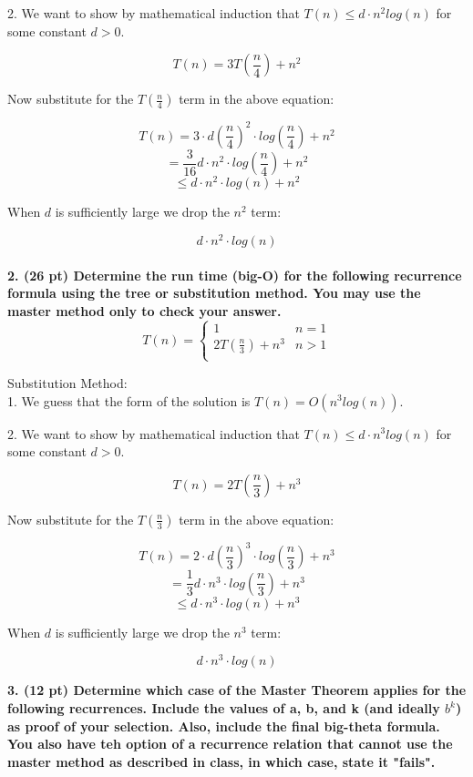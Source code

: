 \documentclass[12pt, a4paper]{article}
\begin{document}
2. We want to show by mathematical induction that $ T(n) \leq d \cdot n^2 log(n) $ for some constant $ d > 0 $. 

\[
  T(n) = 3T \left(\frac{n}{4} \right) + n^2
\]
\begin{center}
  Now substitute for the $T \left(\frac{n}{4} \right)$ term in the above equation:
  \end{center}
\[
  T(n) = 3 \cdot d \left(\frac{n}{4} \right)^2 \cdot log \left(\frac{n}{4} \right) + n^2
\]
\[
  = \frac{3}{16} d \cdot n^2 \cdot log \left(\frac{n}{4} \right) + n^2
\]
\[
  \leq d \cdot n^2 \cdot log(n) + n^2
\]
\begin{center}
  When $d$ is sufficiently large we drop the $ n^2 $ term:
\end{center}
\[
  d \cdot n^2 \cdot log(n)
\]
\\

\textbf{2. (26 pt) Determine the run time (big-O) for the following recurrence formula using the tree or substitution method.
You may use the master method only to check your answer.} \\

\[
  T(n) =  
  \begin{cases}
    1 & n = 1  \\
    2T(\frac{n}{3}) + n^3 & n > 1  \\
  \end{cases}
\]

Substitution Method: \\ 

1. We guess that the form of the solution is $ T(n) = O(n^3 log(n)) $.

2. We want to show by mathematical induction that $ T(n) \leq d \cdot n^3 log(n) $ for some constant $ d > 0 $. 

\[
  T(n) = 2T \left(\frac{n}{3} \right) + n^3
\]
\begin{center}
  Now substitute for the $T \left(\frac{n}{3} \right)$ term in the above equation:
\end{center}
\[
  T(n) = 2 \cdot d \left(\frac{n}{3} \right)^3 \cdot log \left(\frac{n}{3} \right) + n^3
\]
\[
  = \frac{1}{3} d \cdot n^3 \cdot log \left(\frac{n}{3} \right) + n^3
\]
\[
  \leq d \cdot n^3 \cdot log(n) + n^3
\]
\begin{center}
  When $d$ is sufficiently large we drop the $ n^3 $ term:
\end{center}
\[
  d \cdot n^3 \cdot log(n)
\]
\newpage

\textbf{3. (12 pt) Determine which case of the Master Theorem applies for the following recurrences. Include the values of
a, b, and k (and ideally $b^k$) as proof of your selection. Also, include the final big-theta formula. 
You also have teh option of a recurrence relation that cannot use the master method as described in class, 
in which case, state it "fails". }
\end{document}

